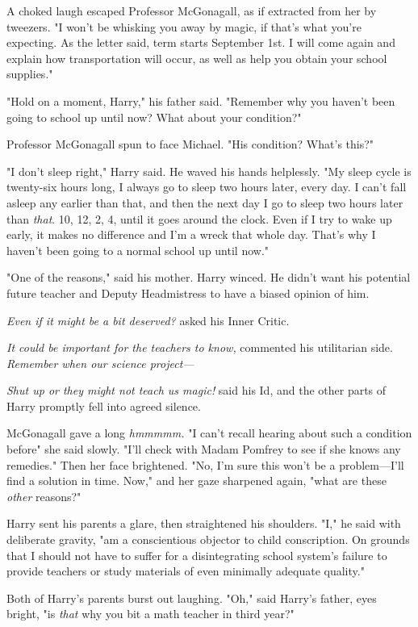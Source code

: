 A choked laugh escaped Professor McGonagall, as if extracted from her by
tweezers. "I won't be whisking you away by
magic, if that's what you're expecting. As the letter said,
term starts September 1st. I will come again and explain
how transportation will occur, as well as help you obtain
your school supplies."

"Hold on a moment, Harry," his father said. "Remember why you haven't been
going to school up until now? What about your condition?"

Professor McGonagall spun to face Michael. "His condition? What's this?"

"I don't sleep right," Harry said. He waved his hands helplessly. "My sleep
cycle is twenty-six hours long, I always go to sleep two hours later, every
day. I can't fall asleep any earlier than that, and then the next day I go to
sleep two hours later than \emph{that}. 10\PM, 12\AM, 2\AM, 4\AM, until it goes
around the clock. Even if I try to wake up early, it makes no difference and
I'm a wreck that whole day. That's why I haven't been going to a normal school
up until now."

"One of the reasons," said his mother. Harry winced. He
didn't want his potential future teacher and Deputy
Headmistress to have a biased opinion of him.

\emph{Even if it might be a bit deserved?} asked his Inner Critic.

\emph{It could be important for the teachers to know,}
commented his utilitarian side. \emph{Remember when our science project—}

\emph{Shut up or they might not teach us magic!} said his Id,
and the other parts of Harry promptly fell into agreed silence.

McGonagall gave a long \emph{hmmmmm.} "I can't recall hearing about such a
condition before{\el}" she said slowly. "I'll check with Madam Pomfrey to
see if she knows any remedies." Then her face brightened. "No, I'm sure this
won't be a problem—I'll find a solution in time. Now," and her gaze sharpened
again, "what are these \emph{other} reasons?"

Harry sent his parents a glare, then straightened his
shoulders. "I," he said with deliberate gravity, "am a
conscientious objector to child conscription. On grounds that
I should not have to suffer for a disintegrating school
system's failure to provide teachers or study materials of
even minimally adequate quality."

Both of Harry's parents burst out laughing.
"Oh," said Harry's father, eyes bright, "is \emph{that} why you
bit a math teacher in third year?"

